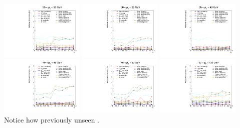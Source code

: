 {
  \centering
  \includegraphics[width=0.3\textwidth]{dates/20121119/figures/unfold/uncertainties_neg_2.pdf}
  \includegraphics[width=0.3\textwidth]{dates/20121119/figures/unfold/uncertainties_neg_3.pdf}
  \includegraphics[width=0.3\textwidth]{dates/20121119/figures/unfold/uncertainties_neg_4.pdf}
  \newline
  \centering
  \includegraphics[width=0.3\textwidth]{dates/20121119/figures/unfold/uncertainties_neg_5.pdf}
  \includegraphics[width=0.3\textwidth]{dates/20121119/figures/unfold/uncertainties_neg_6.pdf}
  \includegraphics[width=0.3\textwidth]{dates/20121119/figures/unfold/uncertainties_neg_7.pdf}
  \newline
  \footnotesize{Notice how previously unseen .}
}


